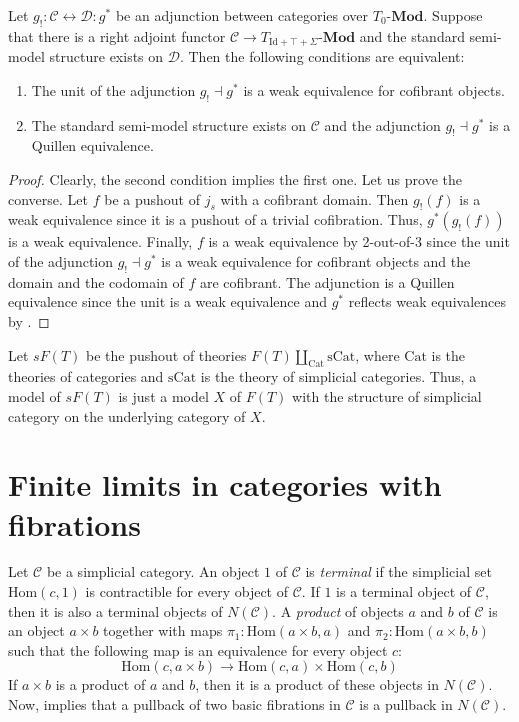 \documentclass[reqno]{amsart}
\theoremstyle{definition}
\theoremstyle{remark}
\newcommand{\fs}[1]{\mathrm{#1}}
\newcommand{\Hom}{\fs{Hom}}
\newcommand{\cat}[1]{\mathcal{#1}}
\newcommand{\C}{\cat{C}}
\newcommand{\bcat}[1]{\mathbf{#1}}
\newcommand{\Mod}[1]{#1\text{-}\bcat{Mod}}
\numberwithin{figure}{section}
\begin{document}
\begin{prop}
Let $g_! : \mathcal{C} \leftrightarrow \mathcal{D} : g^*$ be an adjunction between categories over $\Mod{T_0}$.
Suppose that there is a right adjoint functor $\mathcal{C} \to \Mod{T_{\fs{Id} + \top + \Sigma}}$ and the standard semi-model structure exists on $\mathcal{D}$.
Then the following conditions are equivalent:
\begin{enumerate}
\item The unit of the adjunction $g_! \dashv g^*$ is a weak equivalence for cofibrant objects.
\item The standard semi-model structure exists on $\mathcal{C}$ and the adjunction $g_! \dashv g^*$ is a Quillen equivalence.
\end{enumerate}
\end{prop}
\begin{proof}
Clearly, the second condition implies the first one.
Let us prove the converse.
Let $f$ be a pushout of $j_s$ with a cofibrant domain.
Then $g_!(f)$ is a weak equivalence since it is a pushout of a trivial cofibration.
Thus, $g^*(g_!(f))$ is a weak equivalence.
Finally, $f$ is a weak equivalence by 2-out-of-3 since the unit of the adjunction $g_! \dashv g^*$ is a weak equivalence for cofibrant objects and the domain and the codomain of $f$ are cofibrant.
The adjunction is a Quillen equivalence since the unit is a weak equivalence and $g^*$ reflects weak equivalences by .
\end{proof}

Let $sF(T)$ be the pushout of theories $F(T) \amalg_{\fs{Cat}} \fs{\fs{sCat}}$, where $\fs{Cat}$ is the theories of categories and $\fs{sCat}$ is the theory of simplicial categories.
Thus, a model of $sF(T)$ is just a model $X$ of $F(T)$ with the structure of simplicial category on the underlying category of $X$.

\section{Finite limits in categories with fibrations}

Let $\C$ be a simplicial category.
An object $1$ of $\C$ is \emph{terminal} if the simplicial set $\Hom(c,1)$ is contractible for every object of $\C$.
If $1$ is a terminal object of $\C$, then it is also a terminal objects of $N(\C)$.
A \emph{product} of objects $a$ and $b$ of $\C$ is an object $a \times b$ together with maps $\pi_1 : \Hom(a \times b, a)$ and $\pi_2 : \Hom(a \times b, b)$ such that the following map is an equivalence for every object $c$:
\[ \Hom(c, a \times b) \to \Hom(c,a) \times \Hom(c,b) \]
If $a \times b$ is a product of $a$ and $b$, then it is a product of these objects in $N(\C)$.
Now,  implies that a pullback of two basic fibrations in $\C$ is a pullback in $N(\C)$.



\end{document}
